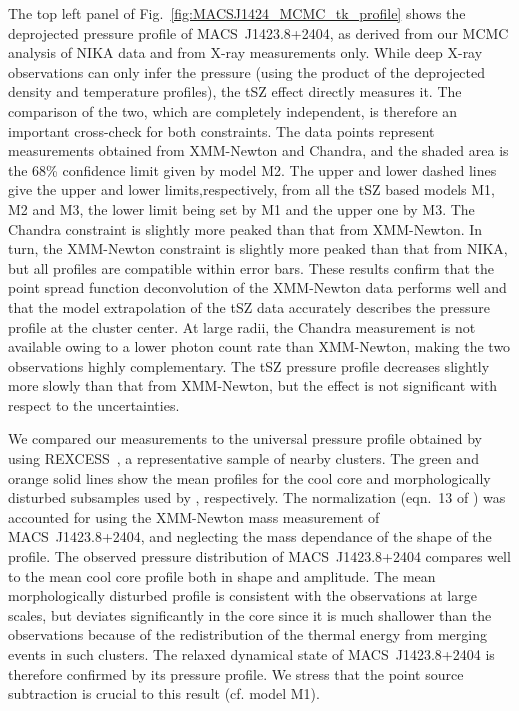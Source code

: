 \documentclass[traditabstract]{aa}
\newcommand{\rexcess}{{\gwpfont REXCESS}}
\begin{document}
The top left panel of Fig.~\ref{fig:MACSJ1424_MCMC_tk_profile} shows the deprojected pressure profile of \mbox{MACS~J1423.8+2404,} as derived from our MCMC analysis of NIKA data and from X-ray measurements only. While deep X-ray observations can only infer the pressure (using the product of the deprojected density and temperature profiles), the tSZ effect directly measures it. The comparison of the two, which are completely independent, is therefore an important cross-check for both constraints. The data points represent measurements obtained from XMM-Newton and Chandra, and the shaded area is the 68\% confidence limit given by model M2. The upper and lower dashed lines give  the upper and lower limits,respectively, from all the tSZ based models M1, M2 and M3, the lower limit being set by M1 and the upper one by M3. The Chandra constraint is slightly more peaked than that from XMM-Newton. In turn, the XMM-Newton constraint is slightly more peaked than that from NIKA, but all profiles are compatible within error bars. These results confirm that the point spread function deconvolution of the XMM-Newton data performs well and that the model extrapolation of the tSZ data accurately describes the pressure profile at the cluster center. At large radii, the Chandra measurement is not available owing to a lower photon count rate  than XMM-Newton, making the two observations highly complementary. The tSZ  pressure profile decreases slightly more slowly than that from XMM-Newton, but the effect is not significant with respect to the uncertainties. 

We compared our measurements to the universal pressure profile obtained by \cite{arnaud2010} using  \rexcess\  \citep{bohringer2007}, a representative sample of nearby clusters. The green and orange solid lines show the mean profiles for the cool core and morphologically disturbed subsamples used by \cite{arnaud2010}, respectively. The normalization (eqn.~13 of \cite{arnaud2010}) was accounted for using the XMM-Newton mass measurement of \mbox{MACS~J1423.8+2404}, and neglecting the mass dependance of the shape of the profile. The observed pressure distribution of  \mbox{MACS~J1423.8+2404} compares well to the mean cool core profile both in shape and amplitude. The mean morphologically disturbed profile is consistent with the observations at large scales, but deviates significantly in the core since it is much shallower than the observations because of the redistribution of the thermal energy from merging events in such clusters. The relaxed dynamical state of \mbox{MACS~J1423.8+2404} is therefore confirmed by its pressure profile. We stress that the point source subtraction is crucial to this result (cf. model M1).
\end{document}
